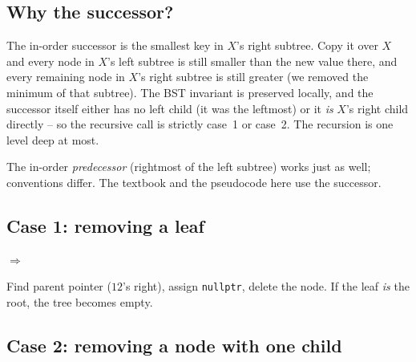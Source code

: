 \documentclass[11pt]{article}
\begin{document}
\subsection*{Why the successor?}

The in-order successor is the smallest key in $X$'s right subtree. Copy it over $X$ and every node in $X$'s left subtree is still smaller than the new value there, and every remaining node in $X$'s right subtree is still greater (we removed the minimum of that subtree). The BST invariant is preserved locally, and the successor itself either has no left child (it was the leftmost) or it \emph{is} $X$'s right child directly -- so the recursive call is strictly case~1 or case~2. The recursion is one level deep at most.

The in-order \emph{predecessor} (rightmost of the left subtree) works just as well; conventions differ. The textbook and the pseudocode here use the successor.

\subsection*{Case 1: removing a leaf}

\begin{center}
\quad $\Longrightarrow$ \quad
{}
\end{center}

Find parent pointer ($12$'s right), assign \texttt{nullptr}, delete the node. If the leaf \emph{is} the root, the tree becomes empty.

\subsection*{Case 2: removing a node with one child}
\end{document}
